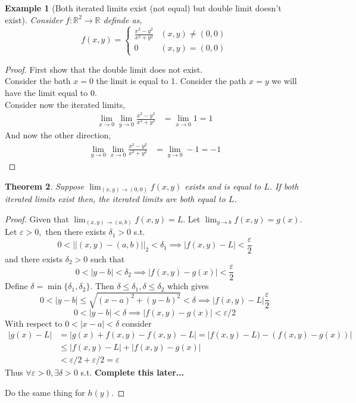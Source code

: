 \documentclass[oneside,11pt,pdftex]{book}%
\numberwithin{equation}{section}
\newtheorem{theorem}{Theorem}[chapter]%
\newtheorem{example}[theorem]{Example}
\numberwithin{section}{chapter}
\numberwithin{equation}{chapter}
\newcommand{\R}{\mathbb{R}}
\begin{document}
\begin{example}[Both iterated limits exist (not equal) but double limit doesn't exist]
	Consider $ f: \R^2 \rightarrow \R  $ definde as,
	\[ f(x,y) = \begin{cases}
		\frac{x^2-y^2}{x^2+y^2} & (x,y)\neq (0,0)\\
		0 & (x,y)=(0,0)
	\end{cases}\]
\end{example}
\begin{proof}
	First show that the double limit does not exist.\\
	Consider the bath $ x=0 $ the limit is equal to 1. Consider the path $ x=y $ we will have the limit equal to $ 0 $.\\
	Consider now the iterated limits,
	\begin{align*}
		\lim_{x\rightarrow 0} \lim_{y \rightarrow 0} \frac{x^2-y^2}{x^2+y^2} &= \lim_{x \rightarrow 0} 1= 1
	\end{align*}
And now the other direction,
\begin{align*}
	\lim_{y \rightarrow 0 } \lim_{x \rightarrow 0} \frac{x^2-y^2}{x^2+y^2}&= \lim_{y \rightarrow 0} -1 =-1
\end{align*}
\end{proof}

\begin{theorem}
	Suppose $ \lim_{(x,y) \rightarrow (0,0)}f(x,y) $ exists and is equal to $ L $. If both iterated limits exist then, the iterated limits are both equal to $ L $.
\end{theorem}
\begin{proof}
	Given that $ \lim_{(x,y) \rightarrow (a,b)} f(x,y)=L$. Let $ \lim_{y \rightarrow b } f(x,y)=g(x).$\\
	Let $ \varepsilon>0, $ then there exists $ \delta_1>0 $ s.t.
	\[ 0<||(x,y)-(a,b)||_2<\delta_1 \implies |f(x,y)-L|<\frac{\varepsilon}{2} \] and there exists $ \delta_2>0 $ such that 
	\[ 0<|y-b|<\delta_2 \implies |f(x,y)-g(x)|< \frac{\varepsilon}{2} \]
	Define $ \delta = \min \{\delta_1, \delta_2 \}$. Then $ \delta \leq \delta_1, \delta \leq \delta_2  $ which gives
	\[ 0< |y-b| \leq \sqrt{(x-a)^2+(y-b)^2} < \delta \implies |f(x,y)-L|\frac{\varepsilon}{2} \]
	\[ 0<|y-b|<\delta \implies |f(x,y)-g(x)|<\varepsilon/2 \]
	With respect to $ 0<|x-a|<\delta  $ consider 
	\begin{align*}
		|g(x)-L|&= | g(x)+f(x,y)-f(x,y)-L|=|f(x,y)-L)-(f(x,y)-g(x))|\\
		& \leq |f(x,y)-L|+|f(x,y)-g(x)|\\
		& < \varepsilon/2+\varepsilon/2=\varepsilon
	\end{align*}
Thus $ \forall \varepsilon>0, \exists \delta>0$ s.t. \textbf{Complete this later...}


Do the same thing for $ h(y) $.
\end{proof}
\end{document}
